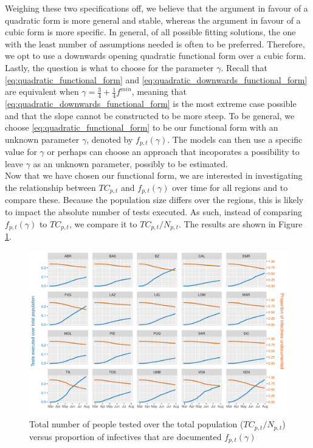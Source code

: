 \documentclass[12pt]{article}
\begin{document}
    Weighing these two specifications off, we believe that the argument in favour of a quadratic form is more general and stable, whereas the argument in favour of a cubic form is more specific. In general, of all possible fitting solutions, the one with the least number of assumptions needed is often to be preferred. Therefore, we opt to use a downwards opening quadratic functional form over a cubic form. \\
    
    Lastly, the question is what to choose for the parameter $\gamma$. Recall that \eqref{eq:quadratic_functional_form} and \eqref{eq:quadratic_downwards_functional_form} are equivalent when $\gamma = \frac{3}{4} + \frac{1}{4}f^{min}$, meaning that \eqref{eq:quadratic_downwards_functional_form} is the most extreme case possible and that the slope cannot be constructed to be more steep. To be general, we choose \eqref{eq:quadratic_functional_form} to be our functional form with an unknown parameter $\gamma$, denoted by $f_{p,t}(\gamma)$. The models can then use a specific value for $\gamma$ or perhaps can choose an approach that incoporates a possibility to leave $\gamma$ as an unknown parameter, possibly to be estimated. \\
	
	Now that we have chosen our functional form, we are interested in investigating the relationship between $TC_{p,t}$ and $f_{p,t}(\gamma)$ over time for all regions and to compare these. Because the population size differs over the regions, this is likely to impact the absolute number of tests executed. As such, instead of comparing $f_{p,t}(\gamma)$ to $TC_{p,t}$, we compare it to $TC_{p,t} / N_{p,t}$. The results are shown in Figure \ref{fig:tamponiprop_versus_ft}. \\
	
	\begin{figure}[ht]
	    \centering
	    \includegraphics[width=\textwidth]{output/tamponiprop_vs_ft.pdf}
	    \caption{Total number of people tested over the total population ($TC_{p,t} / N_{p,t}$) versus proportion of infectives that are documented $f_{p,t}(\gamma)$}
	    \label{fig:tamponiprop_versus_ft}
	\end{figure}
	
\end{document}

